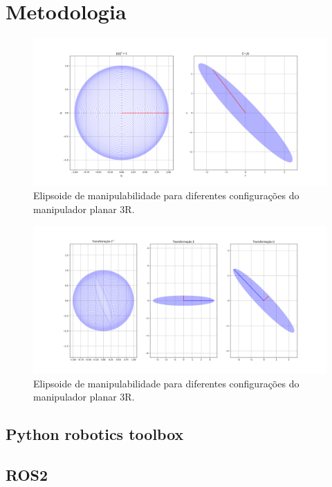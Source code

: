 \chapter{Metodologia}\label{cap:methods}

\begin{figure}
    \centering
    \includegraphics[width=\textwidth]{Images/jacobian-map.png}
    \caption{Elipsoide de manipulabilidade para diferentes configurações do manipulador planar 3R.}\label{fig:jacobian-map}
\end{figure}

\begin{figure}
    \centering
    \includegraphics[width=\textwidth]{Images/jacobian-svd.png}
    \caption{Elipsoide de manipulabilidade para diferentes configurações do manipulador planar 3R.}\label{fig:jacobian-svd}
\end{figure}

\section{Python robotics toolbox}

\section{ROS2}

